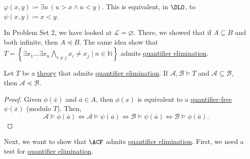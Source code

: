\begin{eg}
	\(\varphi (x, y) \coloneqq \exists u\ (u > x \land u < y)\). This is equivalent, in \(\DLO\), to \(\psi (x, y) \coloneqq x < y\).
\end{eg}

\begin{eg}
	In Problem Set 2, we have looked at \(\mathcal{L} = \varnothing \). There, we showed that if \(A \subseteq B\) and both infinite, then \(A \preceq B\). The same idea show that \(T = \left\{ \exists x_1 \ldots \exists x_{n} \bigwedge_{i\neq j} x_i \neq x_j \mid n \in \mathbb{N} \right\} \) admits \hyperref[def:quantifier-elimination]{quantifier elimination}.
\end{eg}

\begin{proposition}
	Let \(T\) be a \hyperref[def:theory]{theory} that admits \hyperref[def:quantifier-elimination]{quantifier elimination}. If \(\mathcal{A}, \mathcal{B} \models T\) and \(\mathcal{A} \subseteq \mathcal{B} \), then \(\mathcal{A} \preceq \mathcal{B} \).
\end{proposition}
\begin{proof}
	Given \(\phi (\overline{x} )\) and \(\overline{a} \in A\), then \(\phi (x)\) is equivalent to a \hyperref[not:quantifier-free]{quantifier-free} \(\psi (\overline{x} )\) (modulo \(T\)). Then,
	\[
		\mathcal{A} \models \phi (\overline{a} )
		\iff \mathcal{A} \models \psi (\overline{a} )
		\iff \mathcal{B} \models \psi (\overline{a} )
		\iff \mathcal{B} \models \phi (\overline{a} ).
	\]
\end{proof}

Next, we want to show that \(\ACF\) admits \hyperref[def:quantifier-elimination]{quantifier elimination}. First, we need a test for \hyperref[def:quantifier-elimination]{quantifier elimination}.

